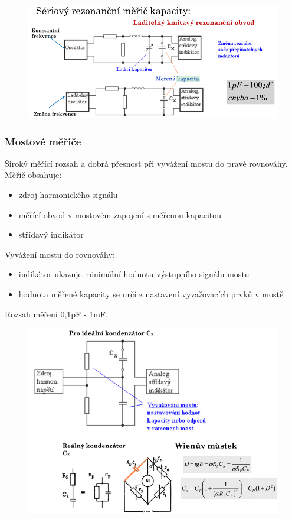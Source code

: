 \begin{figure}[h!]
    \centering
    \includegraphics[scale = 0.5]{images/PrimoukC3.png}
\end{figure}

\subsubsection{Mostové měřiče}
Široký měřící rozsah a dobrá přesnost při vyvážení mostu do pravé rovnováhy.\\
Měřič obsahuje:\\
\begin{itemize}
    \item zdroj harmonického signálu
    \item měřící obvod v mostovém zapojení s měřenou kapacitou
    \item střídavý indikátor
\end{itemize}
Vyvážení mostu do rovnováhy:\\
\begin{itemize}
    \item indikátor ukazuje minimální hodnotu výstupního signálu mostu
    \item hodnota měřené kapacity se určí z nastavení vyvažovacích prvků v mostě
\end{itemize}
Rozsah měření 0,1pF - 1mF.\\
\begin{figure}
    \centering
    \includegraphics[scale = 0.5]{images/CMost.png}
\end{figure}

